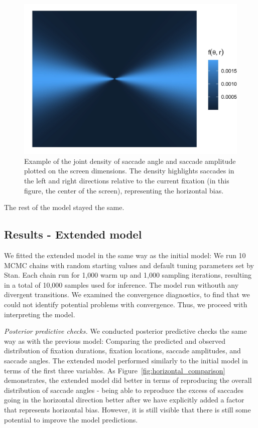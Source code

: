\documentclass{article}
\begin{document}
\begin{figure}
    \centering
    \includegraphics[width=\linewidth]{figures/horizontal_example.jpg}
    \caption{Example of the joint density of saccade angle and saccade amplitude plotted on the screen dimensions. The density highlights saccades in the left and right directions relative to the current fixation (in this figure, the center of the screen), representing the horizontal bias.}
    \label{fig:horizontal_example}
\end{figure}

The rest of the model stayed the same.

\subsection{Results - Extended model}

We fitted the extended model in the same way as the initial model: We run 10 MCMC chains with random starting values and default tuning parameters set by Stan. Each chain run for 1,000 warm up and 1,000 sampling iterations, resulting in a total of 10,000 samples used for inference. The model run withouth any divergent transitions. We examined the convergence diagnostics, to find that we could not identify potential problems with convergence. Thus, we proceed with interpreting the model.

\textit{Posterior predictive checks.} We conducted posterior predictive checks the same way as with the previous model: Comparing the predicted and observed distribution of fixation durations, fixation locations, saccade amplitudes, and saccade angles. The extended model performed similarly to the initial model in terms of the first three variables. As Figure~\ref{fig:horizontal_comparison} demonstrates, the extended model did better in terms of reproducing the overall distribution of saccade angles - being able to reproduce the excess of saccades going in the horizontal direction better after we have explicitly added a factor that represents horizontal bias. However, it is still visible that there is still some potential to improve the model predictions.
\end{document}
